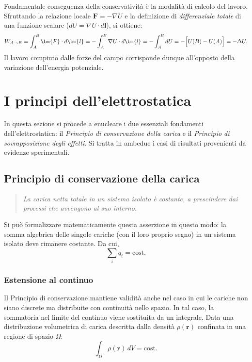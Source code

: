 \documentclass[a4paper,11pt]{report}
\begin{document}
\noindent
Fondamentale conseguenza della conservatività è la modalità di calcolo del lavoro. Sfruttando la relazione locale $\bm{F} = -\nabla U$ e la definizione di \textit{differenziale totale} di una funzione scalare ($dU = \nabla U \cdot d\bm{l}$), si ottiene:
\begin{equation}
    W_{A \to B} = \int_A^B \bm{F} \cdot d\bm{l} = - \int_A^B \nabla U \cdot d\bm{l} = - \int_A^B dU = -\Bigl[ U(B) - U(A) \Bigr] = -\Delta U.
    \label{eq:teorema_lavoro_energia}
\end{equation}
Il lavoro compiuto dalle forze del campo corrisponde dunque all'opposto della variazione dell'energia potenziale.


\section{I principi dell'elettrostatica}
In questa sezione si procede a enucleare i due essenziali fondamenti dell'elettrostatica: il \textit{Principio di conservazione della carica} e il \textit{Principio di sovrapposizione degli effetti}. Si tratta in ambedue i casi di risultati provenienti da evidenze sperimentali.

\subsection{Principio di conservazione della carica}
\begin{quote}
\textit{La carica netta totale in un sistema isolato è costante, a prescindere dai processi che avvengono al suo interno.}
\end{quote}
Si può formalizzare matematicamente questa asserzione in questo modo: la somma algebrica delle singole cariche (con il loro proprio segno) in un sistema isolato deve rimanere costante. Da cui,
\begin{equation}
    \sum_i q_i = \text{cost.}
\end{equation}

\subsubsection{Estensione al continuo}
Il Principio di conservazione mantiene validità anche nel caso in cui le cariche non siano discrete ma distribuite con continuità nello spazio. In tal caso, la sommatoria nel limite del continuo viene sostituita da un integrale.
Data una distribuzione volumetrica di carica descritta dalla densità $\rho(\bm{r})$ confinata in una regione di spazio $\Omega$:
\begin{equation}
     \int_\Omega \rho (\bm{r}) \, dV = \text{cost.}
\end{equation}
\end{document}
